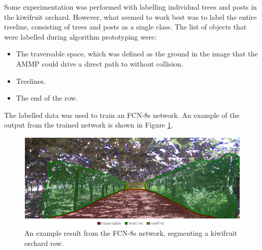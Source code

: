 \documentclass[preprint,authoryear,12pt]{elsarticle}
\begin{document}
    Some experimentation was performed with labelling individual trees and posts in the kiwifruit orchard.
	However, what seemed to work best was to label the entire treeline, consisting of trees and posts as a single class.
	The list of objects that were labelled during algorithm prototyping were:
    \begin{itemize}
    \item The traversable space, which was defined as the ground in the image that the AMMP could drive a direct path to without collision.
    \item Treelines.
    \item The end of the row.
    \end{itemize}

    The labelled data was used to train an FCN-8s network.
	An example of the output from the trained network is shown in Figure \ref{fig:semSegRowResults}.

    \begin{figure}[htb]
        \centering
        \includegraphics[width=\linewidth]{imgs/photos/semSegRowResults.png}
        \caption{
            An example result from the FCN-8s network, segmenting a kiwifruit orchard row.
        }
        \label{fig:semSegRowResults}
    \end{figure}
\end{document}
